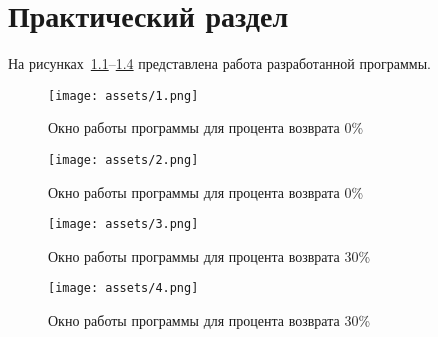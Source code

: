 \chapter{Практический раздел}

На рисунках~\ref{fig:1}--\ref{fig:4} представлена работа разработанной программы.

\begin{figure}[ht]
    \centering
    \texttt{[image: assets/1.png]}
    \caption{Окно работы программы для процента возврата 0\%}
    \label{fig:1}
\end{figure}

\begin{figure}[ht]
    \centering
    \texttt{[image: assets/2.png]}
    \caption{Окно работы программы для процента возврата 0\%}
    \label{fig:2}
\end{figure}

\newpage

\begin{figure}[ht]
    \centering
    \texttt{[image: assets/3.png]}
    \caption{Окно работы программы для процента возврата 30\%}
    \label{fig:3}
\end{figure}

\begin{figure}[ht]
    \centering
    \texttt{[image: assets/4.png]}
    \caption{Окно работы программы для процента возврата 30\%}
    \label{fig:4}
\end{figure}

